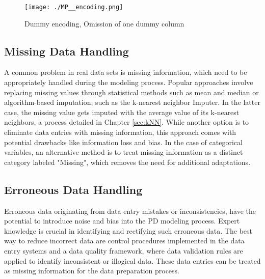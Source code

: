 \begin{figure}[H]
	\centering
	\texttt{[image: ./MP\_\_encoding.png]}
    \caption{Dummy encoding, Omission of one dummy column}
    \label{fig:dp_dumenc}
\end{figure}

\subsection{Missing Data Handling}
A common problem in real data sets is missing information, which need to be appropriately handled during the modeling process. Popular approaches involve replacing missing values through statistical methods such as mean and median or algorithm-based imputation, such as the k-nearest neighbor Imputer. In the latter case,  the missing value gets imputed with the average value of its k-nearest neighbors, a process detailed in Chapter \ref{sec:kNN}. While another option is to eliminate data entries with missing information, this approach comes with potential drawbacks like information loss and bias. In the case of categorical variables, an alternative method is to treat missing information as a distinct category labeled "Missing", which removes the need for additional adaptations. \cite[p.~207]{Python:2022}

\subsection{Erroneous Data Handling}
Erroneous data originating from data entry mistakes or inconsistencies, have the potential to introduce noise and bias into the PD modeling process. Expert knowledge is crucial in identifying and rectifying such erroneous data. The best way to reduce incorrect data are control procedures implemented in the data entry systems and a data quality framework, where data validation rules are applied to identify inconsistent or illogical data. These data entries can be treated as missing information for the data preparation process.


